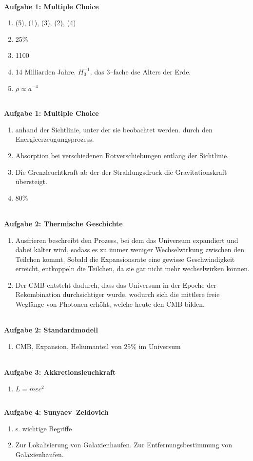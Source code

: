 \documentclass[a4paper,12pt]{article}
\numberwithin{equation}{section}
\begin{document}
\hfill\\\textbf{Aufgabe 1: Multiple Choice}
\begin{enumerate}[label=\arabic*.]
        \item (5), (1), (3), (2), (4)
        \item 25\%
        \item 1100
        \item 14 Milliarden Jahre. $H_0^{-1}$. das 3--fache dse Alters der Erde.
        \item $\rho \propto a^{-4}$
\end{enumerate}
\hfill\\\textbf{Aufgabe 1: Multiple Choice}
\begin{enumerate}[label=\arabic*.]
        \item anhand der Sichtlinie, unter der sie beobachtet werden. durch den Energieerzeugungsprozess.
        \item Absorption bei verschiedenen Rotverschiebungen entlang der Sichtlinie.
        \item Die Grenzleuchtkraft ab der der Strahlungsdruck die Gravitationskraft übersteigt.
        \item 80\%
\end{enumerate}
\hfill\\\textbf{Aufgabe 2: Thermische Geschichte}
\begin{enumerate}[label=\arabic*.]
        \item Ausfrieren beschreibt den Prozess, bei dem das Universum expandiert und dabei kälter wird, sodass es zu immer weniger Wechselwirkung zwischen den Teilchen kommt. Sobald die Expansionsrate eine gewisse Geschwindigkeit erreicht, entkoppeln die Teilchen, da sie gar nicht mehr wechselwirken können.
        \item Der CMB entsteht dadurch, dass das Universum in der Epoche der Rekombination durchsichtiger wurde, wodurch sich die mittlere freie Weglänge von Photonen erhöht, welche heute den CMB bilden.
\end{enumerate}
\hfill\\\textbf{Aufgabe 2: Standardmodell}
\begin{enumerate}[label=\arabic*.]
       \item CMB, Expansion, Heliumanteil von 25\% im Universum
\end{enumerate}
\hfill\\\textbf{Aufgabe 3: Akkretionsleuchkraft}
\begin{enumerate}[label=\arabic*.]
        \item $L=\dot{m}\varepsilon c^2$ 
\end{enumerate}
\hfill\\\textbf{Aufgabe 4: Sunyaev--Zeldovich}
\begin{enumerate}[label=\arabic*.]
        \item s. wichtige Begriffe
        \item Zur Lokalisierung von Galaxienhaufen. Zur Entfernungsbestimmung von Galaxienhaufen.
\end{enumerate}
\end{document}
